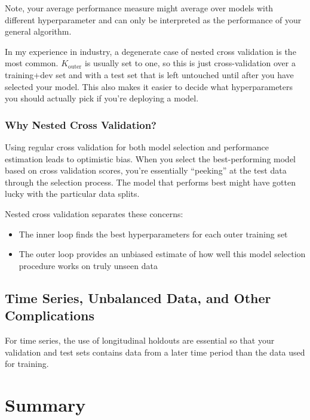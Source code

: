 Note, your average performance measure might average over models with different hyperparameter and can only be interpreted as the performance of your general algorithm.

In my experience in industry, a degenerate case of nested cross validation is the most common. $K_{\mathrm{outer}}$ is usually set to one, so this is just cross-validation over a training+dev set and with a test set that is left untouched until after you have selected your model. This also makes it easier to decide what hyperparameters you should actually pick if you're deploying a model.

\subsubsection{Why Nested Cross Validation?}

Using regular cross validation for both model selection and performance estimation leads to optimistic bias. When you select the best-performing model based on cross validation scores, you're essentially ``peeking'' at the test data through the selection process. The model that performs best might have gotten lucky with the particular data splits.

Nested cross validation separates these concerns:
\begin{itemize}
\item The inner loop finds the best hyperparameters for each outer training set
\item The outer loop provides an unbiased estimate of how well this model selection procedure works on truly unseen data
\end{itemize}

\subsection{Time Series, Unbalanced Data, and Other Complications}

For time series, the use of longitudinal holdouts are essential so that your validation and test sets contains data from a later time period than the data used for training.

\section{Summary}


